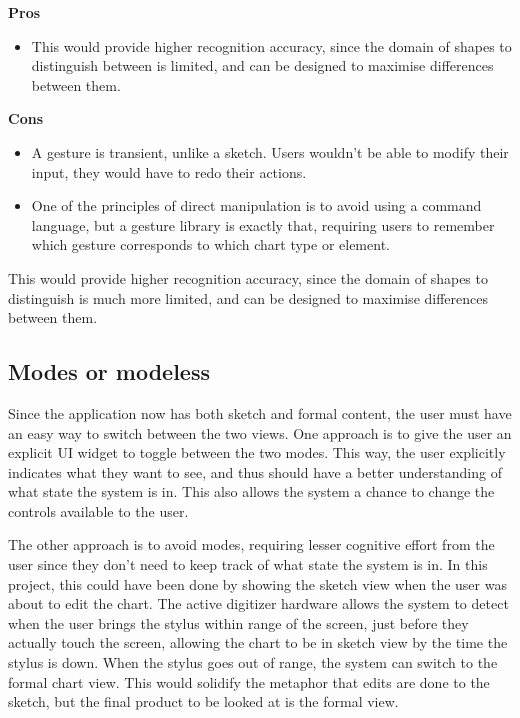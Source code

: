			\textbf{Pros}
			\begin{itemize}
			\item This would provide higher recognition accuracy, since the domain of shapes to distinguish between is limited, and can be designed to maximise differences between them. 
			\end{itemize}
			
			
			\textbf{Cons} 
			\begin{itemize}
			\item A gesture is transient, unlike a sketch. Users wouldn't be able to modify their input, they would have to redo their actions. 
			\item One of the principles of direct manipulation is to avoid using a command language, but a gesture library is exactly that, requiring users to remember which gesture corresponds to which chart type or element. 
			\end{itemize}
				
	
	This would provide higher recognition accuracy, since the domain of shapes to distinguish is much more limited, and can be designed to maximise differences between them. 
	
	\subsection{Modes or modeless}
	Since the application now has both sketch and formal content, the user must have an easy way to switch between the two views. One approach is to give the user an explicit UI widget to toggle between the two modes. This way, the user explicitly indicates what they want to see, and thus should have a better understanding of what state the system is in. This also allows the system a chance to change the controls available to the user.
	
	The other approach is to avoid modes, requiring lesser cognitive effort from the user since they don't need to keep track of what state the system is in. In this project, this could have been done by showing the sketch view when the user was about to edit the chart. The active digitizer hardware allows the system to detect when the user brings the stylus within range of the screen, just before they actually touch the screen, allowing the chart to be in sketch view by the time the stylus is down. When the stylus goes out of range, the system can switch to the formal chart view. This would solidify the metaphor that edits are done to the sketch, but the final product to be looked at is the formal view. 
	
